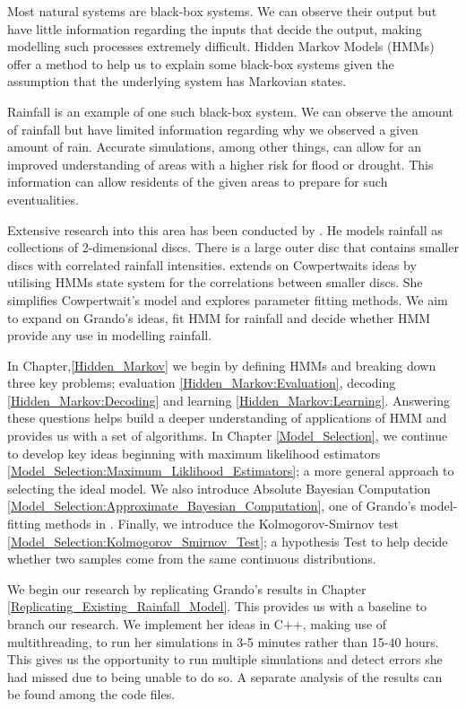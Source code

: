Most natural systems are black-box systems. We can observe their output but have little information regarding the inputs that decide the output,  making modelling such processes extremely difficult.  Hidden Markov Models (HMMs) offer a method to help us to explain some black-box systems given the assumption that the underlying system has Markovian states.

Rainfall is an example of one such black-box system. We can observe the amount of rainfall but have limited information regarding why we observed a given amount of rain.  Accurate simulations, among other things,  can allow for an improved understanding of areas with a higher risk for flood or drought. This information can allow residents of the given areas to prepare for such eventualities.

Extensive research into this area has been conducted by \cite{Cowpertwait1994}. He models rainfall as collections of 2-dimensional discs. There is a large outer disc that contains smaller discs with correlated rainfall intensities. \cite{Grando2019} extends on Cowpertwaits ideas by utilising HMMs state system for the correlations between smaller discs. She simplifies Cowpertwait's model and explores parameter fitting methods. We aim to expand on Grando's ideas, fit HMM for rainfall and decide whether HMM provide any use in modelling rainfall.

In Chapter,\ref{Hidden_Markov} we begin by defining HMMs and breaking down three key problems; evaluation \ref{Hidden_Markov:Evaluation}, decoding \ref{Hidden_Markov:Decoding} and learning \ref{Hidden_Markov:Learning}. Answering these questions helps build a deeper understanding of applications of HMM and provides us with a set of algorithms. In Chapter \ref{Model_Selection}, we continue to develop key ideas beginning with maximum likelihood estimators \ref{Model_Selection:Maximum_Liklihood_Estimators}; a more general approach to selecting the ideal model.  We also introduce Absolute Bayesian Computation \ref{Model_Selection:Approximate_Bayesian_Computation}, one of Grando's model-fitting methods in \cite{Grando2019}. Finally, we introduce the Kolmogorov-Smirnov test \ref{Model_Selection:Kolmogorov_Smirnov_Test}; a hypothesis Test to help decide whether two samples come from the same continuous distributions.

We begin our research by replicating Grando's results in Chapter \ref{Replicating_Existing_Rainfall_Model}. This provides us with a baseline to branch our research. We implement her ideas in C++, making use of multithreading, to run her simulations in 3-5 minutes rather than 15-40 hours. This gives us the opportunity to run multiple simulations and detect errors she had missed due to being unable to do so. A separate analysis of the results can be found among the code files. 

